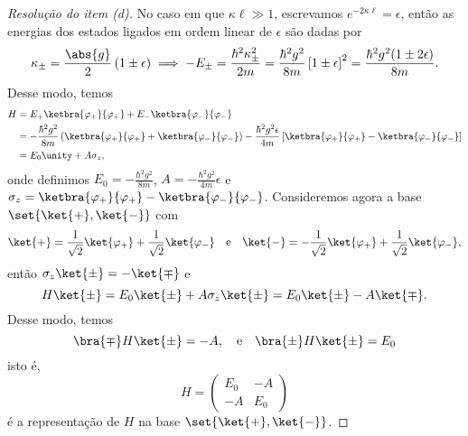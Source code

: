\begin{proof}[Resolução do item (d)]
    No caso em que \(\kappa \ell \gg 1\), escrevamos \(e^{-2 \kappa \ell} = \epsilon\), então as energias dos estados ligados em ordem linear de \(\epsilon\) são dadas por
    \begin{equation*}
        \kappa_\pm = \frac{\abs{g}}{2}\left(1 \pm \epsilon\right) \implies -E_\pm =\frac{\hbar^2 \kappa_{\pm}^2}{2m} = \frac{\hbar^2g^2}{8m} \left[1 \pm \epsilon\right]^2 = \frac{\hbar^2 g^2(1 \pm 2 \epsilon)}{8m}.
    \end{equation*}
    Desse modo, temos
    \begin{align*}
        H &= E_+ \ketbra{\varphi_+}{\varphi_+} + E_- \ketbra{\varphi_-}{\varphi_-} \\
          &= -\frac{\hbar^2g^2}{8m} \left(\ketbra{\varphi_+}{\varphi_+} + \ketbra{\varphi_-}{\varphi_-}\right) - \frac{\hbar^2 g^2 \epsilon}{4m} \left[\ketbra{\varphi_+}{\varphi_+} - \ketbra{\varphi_-}{\varphi_-}\right]\\
          &= E_0 \unity + A \sigma_z,
    \end{align*}
    onde definimos \(E_0 = -\frac{\hbar^2 g^2}{8m}\), \(A = -\frac{\hbar^2 g^2}{4m}\epsilon\) e \(\sigma_z = \ketbra{\varphi_+}{\varphi_+} - \ketbra{\varphi_-}{\varphi_-}\).
    Consideremos agora a base \(\set{\ket{+}, \ket{-}}\) com
    \begin{equation*}
        \ket{+} = \frac{1}{\sqrt{2}} \ket{\varphi_+} + \frac{1}{\sqrt{2}}\ket{\varphi_-}
        \quad\text{e}\quad
        \ket{-} = -\frac{1}{\sqrt{2}} \ket{\varphi_+} + \frac{1}{\sqrt{2}}\ket{\varphi_-},
    \end{equation*}
    então \(\sigma_z \ket{\pm} = -\ket{\mp}\) e
    \begin{equation*}
        H\ket{\pm} = E_0 \ket{\pm} + A \sigma_z \ket{\pm} = E_0 \ket{\pm} - A \ket{\mp}.
    \end{equation*}
    Desse modo, temos
    \begin{equation*}
        \bra{\mp}H\ket{\pm} = -A, \quad\text{e}\quad
        \bra{\pm}H\ket{\pm} = E_0
    \end{equation*}
    isto é,
    \begin{equation*}
        H = \begin{pmatrix}
            E_0 & -A\\
            -A & E_0
        \end{pmatrix}
    \end{equation*}
    é a representação de \(H\) na base \(\set{\ket{+},\ket{-}}\).
\end{proof}
